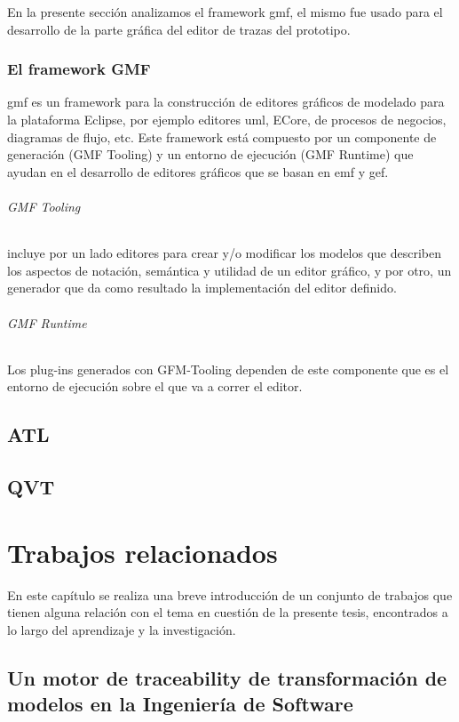 \documentclass[a4paper,12pt,oneside,spanish]{book}
\begin{document}
En la presente sección analizamos el framework \gls{gmf}, el mismo fue usado para el desarrollo de la parte gráfica del editor de trazas del prototipo.

\subsection{El framework GMF}

\gls{gmf} es un framework para la construcción de editores gráficos de modelado para la plataforma Eclipse, por ejemplo editores \gls{uml}, ECore, de procesos de negocios, diagramas de flujo, etc. Este framework está compuesto por un componente de generación (GMF Tooling) y un entorno de ejecución (GMF Runtime) que ayudan en el desarrollo de editores gráficos que se basan en \gls{emf} y \gls{gef}.

\subparagraph{GMF Tooling} incluye por un lado editores para crear y/o modificar los modelos que describen los aspectos de notación, semántica y utilidad de un editor gráfico, y por otro, un generador que da como resultado la implementación del editor definido.

\subparagraph{GMF Runtime} Los plug-ins generados con GFM-Tooling dependen de este componente que es el entorno de ejecución sobre el que va a correr el editor.


\section{ATL}

\section{QVT}


\chapter{Trabajos relacionados}

En este capítulo se realiza una breve introducción de un conjunto de trabajos que tienen alguna relación con el tema en cuestión de la presente tesis, encontrados a lo largo del aprendizaje y la investigación.

\section{Un motor de traceability de transformación de modelos en la Ingeniería de Software}
\end{document}
